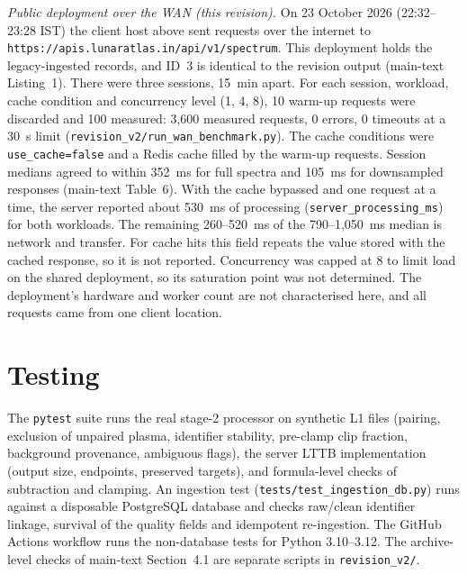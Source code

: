 \documentclass[10pt,a4paper]{article}
\begin{document}
\textit{Public deployment over the WAN (this revision).} On 23 October 2026 (22:32--23:28 IST) the client host above sent requests over the internet to \texttt{https://apis.lunaratlas.in/api/v1/spectrum}. This deployment holds the legacy-ingested records, and ID~3 is identical to the revision output (main-text Listing~1). There were three sessions, 15~min apart. For each session, workload, cache condition and concurrency level (1, 4, 8), 10 warm-up requests were discarded and 100 measured: 3,600 measured requests, 0 errors, 0 timeouts at a 30~s limit (\texttt{revision\_v2/run\_wan\_benchmark.py}). The cache conditions were \texttt{use\_cache=false} and a Redis cache filled by the warm-up requests. Session medians agreed to within 352~ms for full spectra and 105~ms for downsampled responses (main-text Table~6). With the cache bypassed and one request at a time, the server reported about 530~ms of processing (\texttt{server\_processing\_ms}) for both workloads. The remaining 260--520~ms of the 790--1,050~ms median is network and transfer. For cache hits this field repeats the value stored with the cached response, so it is not reported. Concurrency was capped at 8 to limit load on the shared deployment, so its saturation point was not determined. The deployment's hardware and worker count are not characterised here, and all requests came from one client location.

\section*{Testing}

The \texttt{pytest} suite runs the real stage-2 processor on synthetic L1 files (pairing, exclusion of unpaired plasma, identifier stability, pre-clamp clip fraction, background provenance, ambiguous flags), the server LTTB implementation (output size, endpoints, preserved targets), and formula-level checks of subtraction and clamping. An ingestion test (\texttt{tests/test\_ingestion\_db.py}) runs against a disposable PostgreSQL database and checks raw/clean identifier linkage, survival of the quality fields and idempotent re-ingestion. The GitHub Actions workflow runs the non-database tests for Python 3.10--3.12. The archive-level checks of main-text Section~4.1 are separate scripts in \texttt{revision\_v2/}.
\end{document}
